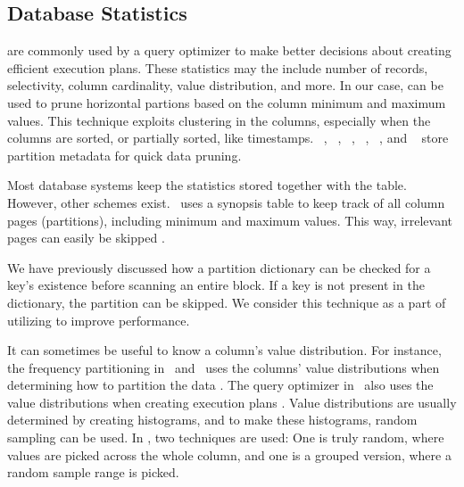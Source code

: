 \subsection{Database Statistics}
\label{sub:Database Statistics}
 are commonly used by a query optimizer to make better decisions about creating efficient execution plans. These statistics may the include number of records, selectivity, column cardinality, value distribution, and more. In our case,  can be used to prune horizontal partions based on the column minimum and maximum values. This technique exploits clustering in the columns, especially when the columns are sorted, or partially sorted, like timestamps. \oracle~\cite{Lahiri2015-mz}, \ibm~\cite{Raman2013-em}, \vertica~\cite{Lamb2012-kg}, \monetx~\cite{Boncz2005-wj}, \mssql~\cite{Larson2013-mc}, and \exasol~\cite{Exasol2014-xh} store partition metadata for quick data pruning.

Most database systems keep the statistics stored together with the table. However, other schemes exist. \ibm~uses a synopsis table to keep track of all column pages (partitions), including minimum and maximum values. This way, irrelevant pages can easily be skipped \cite{Raman2013-em}.

We have previously discussed how a partition dictionary can be checked for a key's existence before scanning an entire block. If a key is not present in the dictionary, the partition can be skipped. We consider this technique as a part of utilizing  to improve performance.

It can sometimes be useful to know a column's value distribution. For instance, the frequency partitioning in \blink~and \ibm~uses the columns' value distributions when determining how to partition the data \cite{Raman2008-gi, Raman2013-em}. The query optimizer in \mssql~also uses the value distributions when creating execution plans \cite{Larson2013-mc}. Value distributions are usually determined by creating histograms, and to make these histograms, random sampling can be used. In \mssql, two techniques are used: One is truly random, where values are picked across the whole column, and one is a grouped version, where a random sample range is picked.

